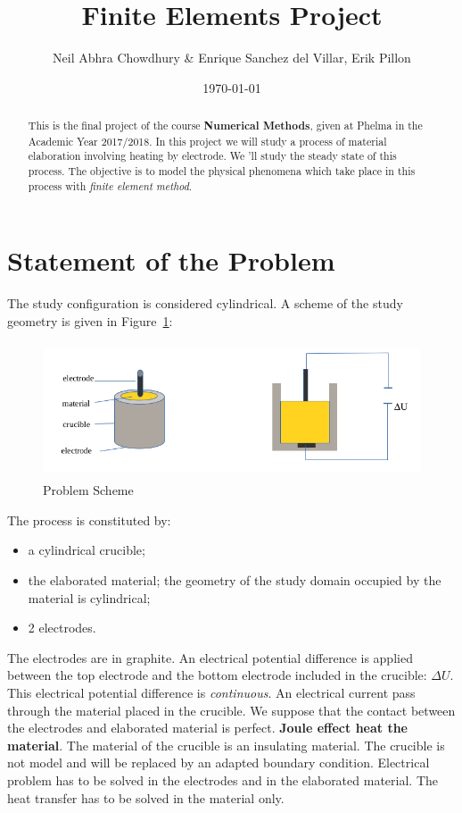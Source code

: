 \documentclass{article}
\date{\today}
\author{Neil Abhra Chowdhury \& Enrique Sanchez del Villar, Erik Pillon}
\title{Finite Elements Project}
\begin{document}
\maketitle
\begin{abstract}
	This is the final project of the course \textbf{Numerical Methods}, given at Phelma in the Academic Year 2017/2018. In this project we will study a process of material elaboration involving heating by electrode. We 'll study the steady state of this process. The objective is to model the physical phenomena which take place in this process with \emph{finite element method}.
\end{abstract}
\section{Statement of the Problem}
The study configuration is considered cylindrical. A scheme of the study geometry is given in Figure~\ref{figure:problem}:
\begin{figure}
	\centering
	\includegraphics[height=4cm]{Images/problem.png}
	\caption{Problem Scheme}
	\label{figure:problem}
\end{figure}
The process is constituted by:
\begin{itemize}
	\item a cylindrical crucible;
	\item the elaborated material; the geometry of the study domain occupied by the material is cylindrical;
	\item 2 electrodes.
\end{itemize}

The electrodes are in graphite. An electrical potential difference is applied between the top electrode and the bottom electrode included in the crucible: $ \Delta U $. This electrical potential difference is \emph{continuous}. An electrical current pass through the material placed in the crucible. We suppose that the contact between the electrodes and elaborated material is perfect. \textbf{Joule effect heat the material}. The material of the crucible is an insulating material. The crucible is not model and will be replaced by an adapted boundary condition. Electrical problem has to be solved in the electrodes and in the elaborated material. The heat transfer has to be solved in the material only.
\end{document}
